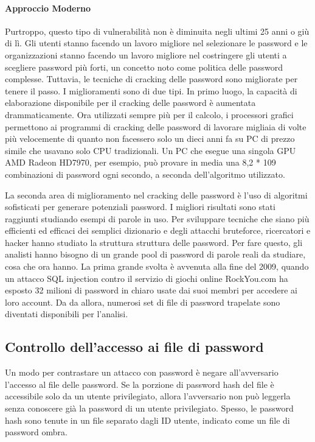 \paragraph{Approccio Moderno}
Purtroppo, questo tipo di vulnerabilità non è diminuita negli ultimi 25 anni o giù di lì. Gli utenti stanno facendo un lavoro migliore nel selezionare le password e le organizzazioni stanno facendo un lavoro migliore nel costringere gli utenti a scegliere password più forti, un concetto noto come politica delle password complesse. Tuttavia, le tecniche di cracking delle password sono migliorate per tenere il passo. I miglioramenti sono di due tipi. In primo luogo, la capacità di elaborazione disponibile per il cracking delle password è aumentata drammaticamente. Ora utilizzati sempre più per il calcolo, i processori grafici permettono ai programmi di cracking delle password di lavorare migliaia di volte più velocemente di quanto non facessero solo un dieci anni fa su PC di prezzo simile che usavano solo CPU tradizionali. Un PC che esegue una singola GPU AMD Radeon HD7970, per esempio, può provare in media una 8,2 * 109 combinazioni di password ogni secondo, a seconda dell'algoritmo utilizzato.

\singlespacing

La seconda area di miglioramento nel cracking delle password è l'uso di algoritmi sofisticati per generare potenziali password. I migliori risultati sono stati raggiunti studiando esempi di parole in uso. Per sviluppare tecniche che siano più efficienti ed efficaci dei semplici dizionario e degli attacchi bruteforce, ricercatori e hacker hanno studiato la struttura struttura delle password. Per fare questo, gli analisti hanno bisogno di un grande pool di password di parole reali da studiare, cosa che ora hanno. La prima grande svolta è avvenuta alla fine del 2009, quando un attacco SQL injection contro il servizio di giochi online RockYou.com ha esposto 32 milioni di password in chiaro usate dai suoi membri per accedere ai loro account. Da da allora, numerosi set di file di password trapelate sono diventati disponibili per l'analisi.

\newpage
\subsection{Controllo dell'accesso ai file di password}
Un modo per contrastare un attacco con password è negare all'avversario l'accesso al file delle password. Se la porzione di password hash del file è accessibile solo da un utente privilegiato, allora l'avversario non può leggerla senza conoscere già la password di un utente privilegiato. Spesso, le password hash sono tenute in un file separato dagli ID utente, indicato come un file di password ombra.

